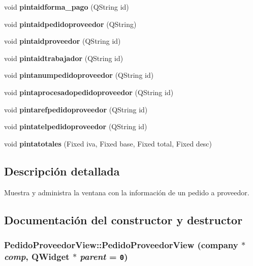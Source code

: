 \begin{CompactItemize}
\item 
void {\bf pintaidforma\_\-pago} (QString id)\label{classPedidoProveedorView_a11}

\item 
void {\bf pintaidpedidoproveedor} (QString)\label{classPedidoProveedorView_a12}

\item 
void {\bf pintaidproveedor} (QString id)\label{classPedidoProveedorView_a13}

\item 
void {\bf pintaidtrabajador} (QString id)\label{classPedidoProveedorView_a14}

\item 
void {\bf pintanumpedidoproveedor} (QString id)\label{classPedidoProveedorView_a15}

\item 
void {\bf pintaprocesadopedidoproveedor} (QString id)\label{classPedidoProveedorView_a16}

\item 
void {\bf pintarefpedidoproveedor} (QString id)\label{classPedidoProveedorView_a17}

\item 
void {\bf pintatelpedidoproveedor} (QString id)\label{classPedidoProveedorView_a18}

\item 
void {\bf pintatotales} (Fixed iva, Fixed base, Fixed total, Fixed desc)\label{classPedidoProveedorView_a19}

\end{CompactItemize}


\subsection{Descripci\'{o}n detallada}
Muestra y administra la ventana con la informaci\'{o}n de un pedido a proveedor. 



\subsection{Documentaci\'{o}n del constructor y destructor}
\subsubsection{\setlength{\rightskip}{0pt plus 5cm}Pedido\-Proveedor\-View::Pedido\-Proveedor\-View ({\bf company} $\ast$ {\em comp}, QWidget $\ast$ {\em parent} = {\tt 0})}\label{classPedidoProveedorView_a5}


